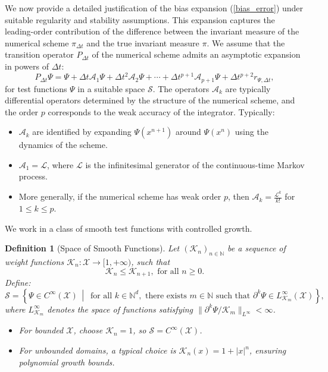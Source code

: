 \documentclass[11pt, twoside]{report}
\newtheorem{definition}[theorem]{Definition}
\begin{document}
We now provide a detailed justification of the bias expansion (\ref{bias_error}) under suitable regularity and stability assumptions. This expansion captures the leading-order contribution of the difference between the invariant measure of the numerical scheme $\pi_{\Delta t}$ and the true invariant measure $\pi$. We assume that the transition operator $P_{\Delta t}$ of the numerical scheme admits an asymptotic expansion in powers of $\Delta t$:
\[
P_{\Delta t} \Psi = \Psi + \Delta t \mathcal{A}_1 \Psi + \Delta t^2 \mathcal{A}_2 \Psi + \cdots + \Delta t^{p+1} \mathcal{A}_{p+1} \Psi + \Delta t^{p+2} r_{\Psi, \Delta t},
\]
for test functions $\Psi$ in a suitable space $\mathcal{S}$. The operators $\mathcal{A}_k$ are typically differential operators determined by the structure of the numerical scheme, and the order $p$ corresponds to the weak accuracy of the integrator. Typically:
\begin{itemize}
    \item $\mathcal{A}_k$ are identified by expanding $\Psi(x^{n+1})$ around $\Psi(x^n)$ using the dynamics of the scheme.
    \item $\mathcal{A}_1 = \mathcal{L}$, where $\mathcal{L}$ is the infinitesimal generator of the continuous-time Markov process.
    \item More generally, if the numerical scheme has weak order $p$, then $\mathcal{A}_k = \frac{\mathcal{L}^k}{k!}$ for $1 \leq k \leq p$.
\end{itemize}  
We work in a class of smooth test functions with controlled growth.
\begin{definition}[Space of Smooth Functions]
Let $(\mathcal{K}_n)_{n \in \mathbb{N}}$ be a sequence of weight functions $\mathcal{K}_n : \mathcal{X} \to [1, +\infty)$, such that
\[\mathcal{K}_n \leq \mathcal{K}_{n+1}, \text{ for all } n \geq 0.\]
Define:
\[
\mathcal{S} = \left\{ \Psi \in C^\infty(\mathcal{X}) \,\middle|\, \text{ for all } k \in \mathbb{N}^d, \text{ there exists } m \in \mathbb{N} \text{ such that } \partial^k \Psi \in L^\infty_{\mathcal{K}_m}(\mathcal{X}) \right\},
\]
where $L^\infty_{\mathcal{K}_m}$ denotes the space of functions satisfying $\|\partial^k \Psi / \mathcal{K}_m\|_{L^\infty} < \infty$.

\begin{itemize}
    \item For bounded $\mathcal{X}$, choose $\mathcal{K}_n = 1$, so $\mathcal{S} = C^\infty(\mathcal{X})$.
    \item For unbounded domains, a typical choice is $\mathcal{K}_n(x) = 1 + |x|^n$, ensuring polynomial growth bounds.
\end{itemize}
\end{definition}
\end{document}
